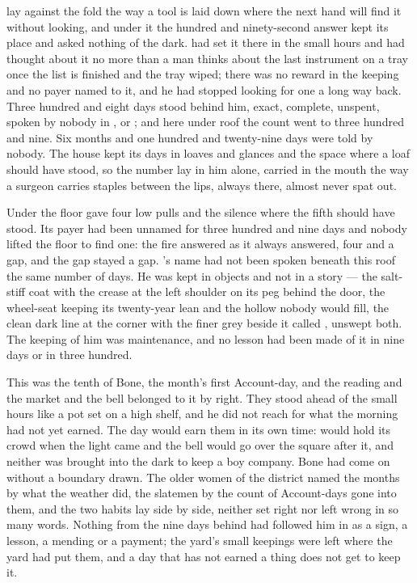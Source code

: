 
 lay against the fold the way a tool is laid down where the next hand will find it without looking, and under it the hundred and ninety-second answer kept its place and asked nothing of the dark.  had set it there in the small hours and had thought about it no more than a man thinks about the last instrument on a tray once the list is finished and the tray wiped; there was no reward in the keeping and no payer named to it, and he had stopped looking for one a long way back. Three hundred and eight days stood behind him, exact, complete, unspent, spoken by nobody in ,  or ; and here under  roof the count went to three hundred and nine. Six months and one hundred and twenty-nine days were told by nobody. The house kept its days in loaves and glances and the space where a loaf should have stood, so the number lay in him alone, carried in the mouth the way a surgeon carries staples between the lips, always there, almost never spat out.

Under the floor  gave four low pulls and the silence where the fifth should have stood. Its payer had been unnamed for three hundred and nine days and nobody lifted the floor to find one: the fire answered as it always answered, four and a gap, and the gap stayed a gap. 's name had not been spoken beneath this roof the same number of days. He was kept in objects and not in a story --- the salt-stiff coat with the crease at the left shoulder on its peg behind the door, the wheel-seat keeping its twenty-year lean and the hollow nobody would fill, the clean dark line at the corner with the finer grey beside it called , unswept both. The keeping of him was maintenance, and no lesson had been made of it in nine days or in three hundred.

This was the tenth of Bone, the month's first Account-day, and the reading and the market and the bell belonged to it by right. They stood ahead of the small hours like a pot set on a high shelf, and he did not reach for what the morning had not yet earned. The day would earn them in its own time:  would hold its crowd when the light came and the bell would go over the square after it, and neither was brought into the dark to keep a boy company. Bone had come on without a boundary drawn. The older women of the district named the months by what the weather did, the slatemen by the count of Account-days gone into them, and the two habits lay side by side, neither set right nor left wrong in so many words. Nothing from the nine days behind had followed him in as a sign, a lesson, a mending or a payment; the yard's small keepings were left where the yard had put them, and a day that has not earned a thing does not get to keep it.


